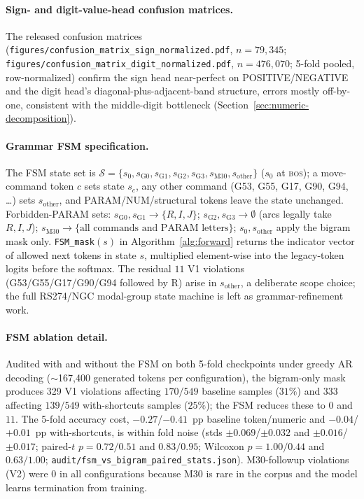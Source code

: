 \documentclass[sensors,article,submit,moreauthors,pdftex]{Definitions/mdpi}
\begin{document}
\paragraph{Sign- and digit-value-head confusion matrices.} The released confusion matrices (\texttt{figures/confusion\_matrix\_sign\_normalized.pdf}, $n\!=\!79{,}345$; \texttt{figures/confusion\_matrix\_digit\_normalized.pdf}, $n\!=\!476{,}070$; 5-fold pooled, row-normalized) confirm the sign head near-perfect on POSITIVE/NEGATIVE and the digit head's diagonal-plus-adjacent-band structure, errors mostly off-by-one, consistent with the middle-digit bottleneck (Section~\ref{sec:numeric-decomposition}).


\paragraph{Grammar FSM specification.} The FSM state set is $\mathcal{S}=\{s_0, s_{\text{G0}}, s_{\text{G1}}, s_{\text{G2}}, s_{\text{G3}}, s_{\text{M30}}, s_{\text{other}}\}$ ($s_0$ at \textsc{bos}); a move-command token $c$ sets state $s_c$, any other command (G53, G55, G17, G90, G94, \ldots) sets $s_{\text{other}}$, and PARAM/NUM/structural tokens leave the state unchanged. Forbidden-PARAM sets: $s_{\text{G0}}, s_{\text{G1}}\!\to\!\{R, I, J\}$; $s_{\text{G2}}, s_{\text{G3}}\!\to\!\emptyset$ (arcs legally take $R, I, J$); $s_{\text{M30}}\!\to\!\{\text{all commands and PARAM letters}\}$; $s_0, s_{\text{other}}$ apply the bigram mask only. \texttt{FSM\_mask}$(s)$ in Algorithm~\ref{alg:forward} returns the indicator vector of allowed next tokens in state $s$, multiplied element-wise into the legacy-token logits before the softmax. The residual $11$ V1 violations (G53/G55/G17/G90/G94 followed by R) arise in $s_{\text{other}}$, a deliberate scope choice; the full RS274/NGC modal-group state machine is left as grammar-refinement work.

\paragraph{FSM ablation detail.} Audited with and without the FSM on both 5-fold checkpoints under greedy AR decoding ($\sim$167{,}400 generated tokens per configuration), the bigram-only mask produces 329 V1 violations affecting $170/549$ baseline samples ($31\%$) and 333 affecting $139/549$ with-shortcuts samples ($25\%$); the FSM reduces these to $0$ and $11$. The 5-fold accuracy cost, $-0.27$/$-0.41$~pp baseline token/numeric and $-0.04$/$+0.01$~pp with-shortcuts, is within fold noise (stds $\pm 0.069$/$\pm 0.032$ and $\pm 0.016$/$\pm 0.017$; paired-$t$ $p=0.72/0.51$ and $0.83/0.95$; Wilcoxon $p=1.00/0.44$ and $0.63/1.00$; \texttt{audit/fsm\_vs\_bigram\_paired\_stats.json}). M30-followup violations (V2) were $0$ in all configurations because M30 is rare in the corpus and the model learns termination from training.
\end{document}
